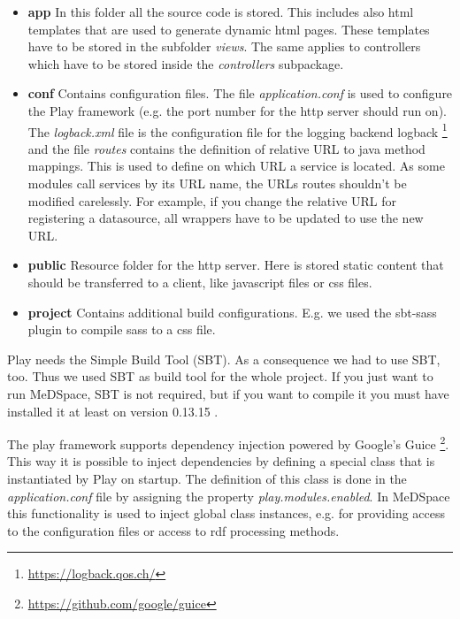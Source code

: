 \begin{itemize}
\item \textbf{app} In this folder all the source code is stored. This includes also html templates that are used to generate dynamic html pages. These templates have to be stored in the subfolder  \emph{views}. The same applies to controllers which have to be stored inside the \emph{controllers} subpackage.

\item \textbf{conf} Contains configuration files. The  file \emph{application.conf} is used to configure the Play framework (e.g. the port number for the http server should run on). The \emph{logback.xml} file is the configuration file for the logging backend logback \footnote{\url{https://logback.qos.ch/}} and the file \emph{routes} contains the definition of relative URL to java method mappings. This is used to define on which URL a service is located. As some modules call services by its URL name, the URLs routes shouldn't be modified carelessly. For example, if you change the relative URL for registering a datasource, all wrappers have to be updated to use the new URL.

\item \textbf{public} Resource folder for the http server. Here is stored static content that should be transferred to a client, like javascript files or css files.

\item \textbf{project} Contains additional build configurations. E.g. we used the sbt-sass plugin to compile sass to a css file. 
\end{itemize} 

Play needs the Simple Build Tool \cite{SBT}(SBT). As a consequence we had to use SBT, too. Thus we used SBT as build tool for the whole project. If you just want to run MeDSpace, SBT is not required, but if you want to compile it you must have installed it at least on version 0.13.15 . 

The play framework supports dependency injection powered by Google's Guice \footnote{\url{https://github.com/google/guice}}. This way it is possible to inject dependencies by defining a special class that is instantiated by Play on startup. The definition of this class is done in the \emph{application.conf} file by assigning the property \emph{play.modules.enabled}. In MeDSpace this functionality is used to inject global class instances, e.g. for providing access to the configuration files or access to rdf processing methods.

